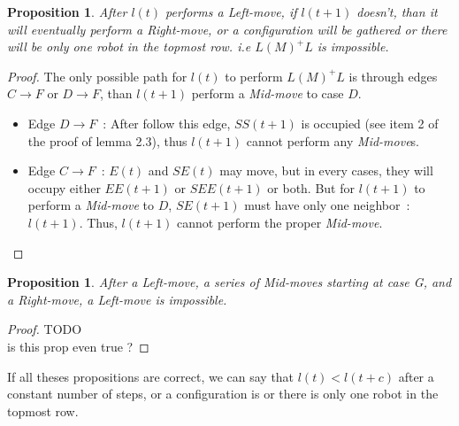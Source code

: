 \documentclass[11pt, a4paper]{article}
\theoremstyle{plain}
\newtheorem{prop}[thm]{Proposition}
\theoremstyle{definition}
\theoremstyle{remark}
\begin{document}
\begin{prop}
After $l(t)$ performs a \emph{Left-move}, if $l(t+1)$ doesn't, than it will
eventually perform a \emph{Right-move}, or a \Gathered configuration will be
gathered or there will be only one robot in the topmost row. i.e $L(M)^{+}L$ is
impossible.
\end{prop}

\begin{proof}
The only possible path for $l(t)$ to perform $L(M)^{+}L$ is through edges $C
\rightarrow F$ or $D \rightarrow F$, than $l(t+1)$ perform a \emph{Mid-move} to
case $D$.

\begin{itemize}
\item Edge $D \rightarrow F$~: After follow this edge, $SS(t+1)$ is occupied
      (see item 2 of the proof of lemma 2.3), thus $l(t+1)$ cannot perform any
      \emph{Mid-move}s.

\item Edge $C \rightarrow F$~: $E(t)$ and $SE(t)$ may move, but in every cases,
      they will occupy either $EE(t+1)$ or $SEE(t+1)$ or both. But for $l(t+1)$
      to perform a \emph{Mid-move} to $D$, $SE(t+1)$ must have only one
      neighbor~: $l(t+1)$. Thus, $l(t+1)$ cannot perform the proper
      \emph{Mid-move}.
\end{itemize}
\end{proof}


\begin{prop}
After a \emph{Left-move}, a series of \emph{Mid-move}s starting at case G,
and a \emph{Right-move}, a \emph{Left-move} is impossible.
\end{prop}

\begin{proof}
TODO\\
is this prop even true ?
\end{proof}

If all theses propositions are correct, we can say that $l(t) < l(t+c)$ after a
constant number of steps, or a configuration is \Gathered or there is only one
robot in the topmost row.

\appendix
\end{document}
